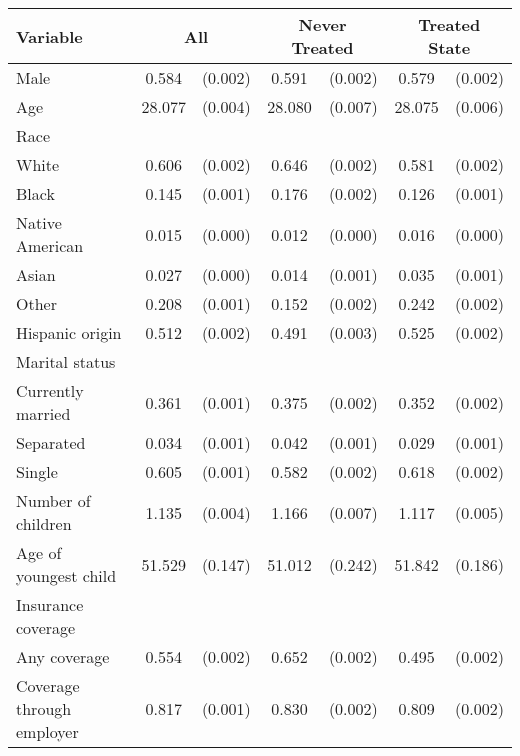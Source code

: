 \begin{tabular}{lcccccc}
\toprule
\toprule
 Variable & \multicolumn{2}{c}{All} & \multicolumn{2}{c}{Never Treated} & \multicolumn{2}{c}{Treated State} \\
\midrule 
 Male  & 0.584 & (0.002)  & 0.591 & (0.002)  & 0.579 & (0.002)  \\
 Age  & 28.077 & (0.004)  & 28.080 & (0.007)  & 28.075 & (0.006)  \\
 Race  & & &  \\
 \hspace{0.3cm}  White  & 0.606 & (0.002)  & 0.646 & (0.002)  & 0.581 & (0.002)  \\
 \hspace{0.3cm}  Black  & 0.145 & (0.001)  & 0.176 & (0.002)  & 0.126 & (0.001)  \\
 \hspace{0.3cm}  Native American  & 0.015 & (0.000)  & 0.012 & (0.000)  & 0.016 & (0.000)  \\
 \hspace{0.3cm}  Asian  & 0.027 & (0.000)  & 0.014 & (0.001)  & 0.035 & (0.001)  \\
 \hspace{0.3cm}  Other  & 0.208 & (0.001)  & 0.152 & (0.002)  & 0.242 & (0.002)  \\
 Hispanic origin  & 0.512 & (0.002)  & 0.491 & (0.003)  & 0.525 & (0.002)  \\
 Marital status  & & &  \\
 \hspace{0.3cm} Currently married  & 0.361 & (0.001)  & 0.375 & (0.002)  & 0.352 & (0.002)  \\
 \hspace{0.3cm} Separated  & 0.034 & (0.001)  & 0.042 & (0.001)  & 0.029 & (0.001)  \\
 \hspace{0.3cm} Single  & 0.605 & (0.001)  & 0.582 & (0.002)  & 0.618 & (0.002)  \\
 Number of children  & 1.135 & (0.004)  & 1.166 & (0.007)  & 1.117 & (0.005)  \\
 Age of youngest child  & 51.529 & (0.147)  & 51.012 & (0.242)  & 51.842 & (0.186)  \\
 Insurance coverage  & & &  \\
 \hspace{0.3cm}  Any coverage  & 0.554 & (0.002)  & 0.652 & (0.002)  & 0.495 & (0.002)  \\
 \hspace{0.3cm}  Coverage through employer  & 0.817 & (0.001)  & 0.830 & (0.002)  & 0.809 & (0.002)  \\

\end{tabular}
